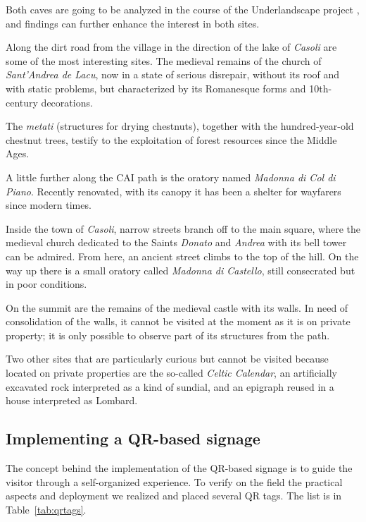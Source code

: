 \documentclass[sustainability,article,submit,pdftex,moreauthors]{Definitions/mdpi}
\begin{document}
Both caves are going to be analyzed in the course of the Underlandscape project , and findings can further enhance the interest in both sites.

Along the dirt road from the village in the direction of the lake of \emph{Casoli} are some of the most interesting sites. The medieval remains of the church of {\em Sant'Andrea de Lacu}, now in a state of serious disrepair, without its roof and with static problems, but characterized by its Romanesque forms and 10th-century decorations. 

The \emph{metati} (structures for drying chestnuts), together with the hundred-year-old chestnut trees, testify to the exploitation of forest resources since the Middle Ages. 

A little further along the CAI path is the oratory named {\em Madonna di Col di Piano}. Recently renovated, with its canopy it has been a shelter for wayfarers since modern times.

Inside the town of \emph{Casoli}, narrow streets branch off to the main square, where the medieval church dedicated to the Saints \emph{Donato} and \emph{Andrea} with its bell tower can be admired. From here, an ancient street climbs to the top of the hill. On the way up there is a small oratory called {\em Madonna di Castello}, still consecrated but in poor conditions. 

On the summit are the remains of the medieval castle with its walls. In need of consolidation of the walls, it cannot be visited at the moment as it is on private property; it is only possible to observe part of its structures from the path. 

Two other sites that are particularly curious but cannot be visited because located on private properties are the so-called  {\em Celtic Calendar}, an artificially excavated rock interpreted as a kind of sundial, and an epigraph reused in a house interpreted as Lombard.

\subsection{Implementing a QR-based signage \label{sec:implementation}}

The concept behind the implementation of the QR-based signage is to guide the visitor through a self-organized experience. To verify on the field the practical aspects and deployment we realized and placed several QR tags. The list is in Table~\ref{tab:qrtags}.
\end{document}
